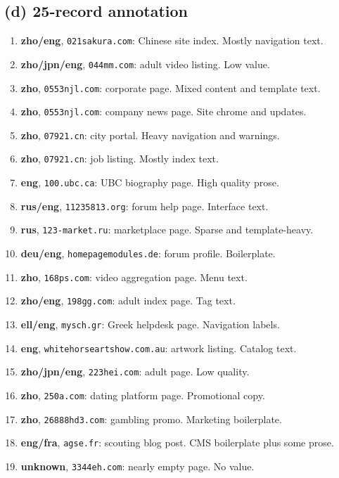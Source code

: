 \documentclass[11pt]{article}
\newcommand{\answer}[1]{#1}
\begin{document}
\subsection*{(d) 25-record annotation}
\answer{
\begin{enumerate}
    \item \textbf{zho/eng}, \texttt{021sakura.com}: Chinese site index. Mostly navigation text.
    \item \textbf{zho/jpn/eng}, \texttt{044mm.com}: adult video listing. Low value.
    \item \textbf{zho}, \texttt{0553njl.com}: corporate page. Mixed content and template text.
    \item \textbf{zho}, \texttt{0553njl.com}: company news page. Site chrome and updates.
    \item \textbf{zho}, \texttt{07921.cn}: city portal. Heavy navigation and warnings.
    \item \textbf{zho}, \texttt{07921.cn}: job listing. Mostly index text.
    \item \textbf{eng}, \texttt{100.ubc.ca}: UBC biography page. High quality prose.
    \item \textbf{rus/eng}, \texttt{11235813.org}: forum help page. Interface text.
    \item \textbf{rus}, \texttt{123-market.ru}: marketplace page. Sparse and template-heavy.
    \item \textbf{deu/eng}, \texttt{homepagemodules.de}: forum profile. Boilerplate.
    \item \textbf{zho}, \texttt{168ps.com}: video aggregation page. Menu text.
    \item \textbf{zho/eng}, \texttt{198gg.com}: adult index page. Tag text.
    \item \textbf{ell/eng}, \texttt{mysch.gr}: Greek helpdesk page. Navigation labels.
    \item \textbf{eng}, \texttt{whitehorseartshow.com.au}: artwork listing. Catalog text.
    \item \textbf{zho/jpn/eng}, \texttt{223hei.com}: adult page. Low quality.
    \item \textbf{zho}, \texttt{250a.com}: dating platform page. Promotional copy.
    \item \textbf{zho}, \texttt{26888hd3.com}: gambling promo. Marketing boilerplate.
    \item \textbf{eng/fra}, \texttt{agse.fr}: scouting blog post. CMS boilerplate plus some prose.
    \item \textbf{unknown}, \texttt{3344eh.com}: nearly empty page. No value.

\end{enumerate}}
\end{document}
